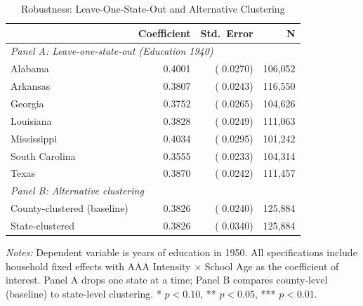 \begin{table}[H]
\centering
\caption{Robustness: Leave-One-State-Out and Alternative Clustering}
\label{tab:robustness}
\begin{threeparttable}
\begin{tabular}{lrrr}
\toprule
& Coefficient & Std.\ Error & N \\
\midrule
\multicolumn{4}{l}{\textit{Panel A: Leave-one-state-out (Education 1940)}} \\
Alabama              &   0.4001 & (  0.0270) & 106,052 \\
Arkansas             &   0.3807 & (  0.0243) & 116,550 \\
Georgia              &   0.3752 & (  0.0265) & 104,626 \\
Louisiana            &   0.3828 & (  0.0249) & 111,063 \\
Mississippi          &   0.4034 & (  0.0295) & 101,242 \\
South Carolina       &   0.3555 & (  0.0233) & 104,314 \\
Texas                &   0.3870 & (  0.0242) & 111,457 \\
\midrule
\multicolumn{4}{l}{\textit{Panel B: Alternative clustering}} \\
County-clustered (baseline) &   0.3826 & (  0.0240) & 125,884 \\
State-clustered            &   0.3826 & (  0.0340) & 125,884 \\
\bottomrule
\end{tabular}
\begin{tablenotes}[flushleft]
\small
\item \textit{Notes:} Dependent variable is years of education in 1950. All specifications include household fixed effects with AAA Intensity $\times$ School Age as the coefficient of interest. Panel A drops one state at a time; Panel B compares county-level (baseline) to state-level clustering. * $p<0.10$, ** $p<0.05$, *** $p<0.01$.
\end{tablenotes}
\end{threeparttable}
\end{table}

